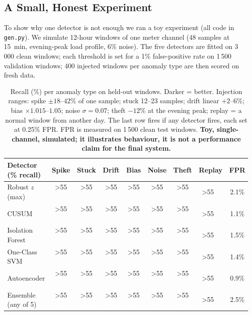 \documentclass[11pt,a4paper]{article}
\newcommand{\hc}[1]{\expandafter\hcaux\expandafter{\the\numexpr #1*8/10\relax}{#1}}
\newcommand{\hcaux}[2]{\cellcolor{mzteal!#1}\ifnum #2>55 \textcolor{white}{#2}\else #2\fi}
\begin{document}
\subsection{A Small, Honest Experiment}
\label{sec:experiment}
To show why one detector is not enough we ran a toy experiment (all code in \texttt{gen.py}). We simulate
12-hour windows of one meter channel (48 samples at 15~min, evening-peak load profile, 6\% noise). The five
detectors are fitted on 3\,000 clean windows; each threshold is set for a 1\% false-positive rate on 1\,500
validation windows; 400 injected windows per anomaly type are then scored on fresh data.

\begin{table}[H]
\centering
\small
\setlength{\tabcolsep}{5pt}
\begin{tabular}{@{}l*{7}{c}|c@{}}
\toprule
\textbf{Detector (\% recall)} & \textbf{Spike} & \textbf{Stuck} & \textbf{Drift} & \textbf{Bias} & \textbf{Noise} & \textbf{Theft} & \textbf{Replay} & \textbf{FPR} \\
\midrule
Robust $z$ (max)      & \hc{78} & \hc{64} & \hc{7}  & \hc{11} & \hc{78} & \hc{22} & \hc{2} & 2.1\% \\
CUSUM                 & \hc{38} & \hc{84} & \hc{36} & \hc{59} & \hc{62} & \hc{64} & \hc{1} & 1.1\% \\
Isolation Forest      & \hc{62} & \hc{84} & \hc{15} & \hc{16} & \hc{86} & \hc{53} & \hc{2} & 1.5\% \\
One-Class SVM         & \hc{66} & \hc{88} & \hc{30} & \hc{66} & \hc{86} & \hc{62} & \hc{2} & 1.4\% \\
Autoencoder           & \hc{54} & \hc{75} & \hc{10} & \hc{30} & \hc{91} & \hc{50} & \hc{2} & 0.9\% \\
Ensemble (any of 5)   & \hc{76} & \hc{85} & \hc{30} & \hc{61} & \hc{88} & \hc{63} & \hc{3} & 2.5\% \\
\bottomrule
\end{tabular}
\caption{Recall (\%) per anomaly type on held-out windows. Darker = better. Injection ranges: spike
$\pm18$--$42\%$ of one sample; stuck 12--23 samples; drift linear $+2$--$6\%$; bias $\times1.015$--$1.05$;
noise $\sigma=0.07$; theft $-12\%$ at the evening peak; replay = a normal window from another day. The last
row fires if any detector fires, each set at 0.25\% FPR. FPR is measured on 1\,500 clean test windows.
\textbf{Toy, single-channel, simulated; it illustrates behaviour, it is not a performance claim for the final
system.}}
\label{tab:experiment}
\end{table}
\end{document}
